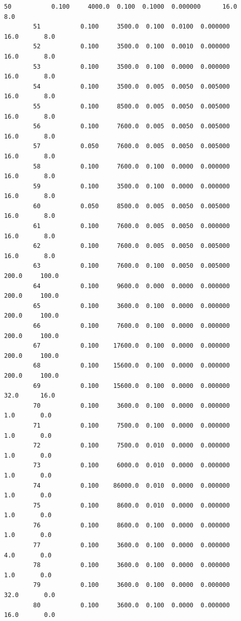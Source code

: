 \documentclass[11pt, a4paper , landscape]{article}
\begin{document}
\begin{Verbatim}[commandchars=\\\{\}]
        50           0.100     4000.0  0.100  0.1000  0.000000      16.0       8.0   
        51           0.100     3500.0  0.100  0.0100  0.000000      16.0       8.0   
        52           0.100     3500.0  0.100  0.0010  0.000000      16.0       8.0   
        53           0.100     3500.0  0.100  0.0000  0.000000      16.0       8.0   
        54           0.100     3500.0  0.005  0.0050  0.005000      16.0       8.0   
        55           0.100     8500.0  0.005  0.0050  0.005000      16.0       8.0   
        56           0.100     7600.0  0.005  0.0050  0.005000      16.0       8.0   
        57           0.050     7600.0  0.005  0.0050  0.005000      16.0       8.0   
        58           0.100     7600.0  0.100  0.0000  0.000000      16.0       8.0   
        59           0.100     3500.0  0.100  0.0000  0.000000      16.0       8.0   
        60           0.050     8500.0  0.005  0.0050  0.005000      16.0       8.0   
        61           0.100     7600.0  0.005  0.0050  0.000000      16.0       8.0   
        62           0.100     7600.0  0.005  0.0050  0.005000      16.0       8.0   
        63           0.100     7600.0  0.100  0.0050  0.005000     200.0     100.0   
        64           0.100     9600.0  0.000  0.0000  0.000000     200.0     100.0   
        65           0.100     3600.0  0.100  0.0000  0.000000     200.0     100.0   
        66           0.100     7600.0  0.100  0.0000  0.000000     200.0     100.0   
        67           0.100    17600.0  0.100  0.0000  0.000000     200.0     100.0   
        68           0.100    15600.0  0.100  0.0000  0.000000     200.0     100.0   
        69           0.100    15600.0  0.100  0.0000  0.000000      32.0      16.0   
        70           0.100     3600.0  0.100  0.0000  0.000000       1.0       0.0   
        71           0.100     7500.0  0.100  0.0000  0.000000       1.0       0.0   
        72           0.100     7500.0  0.010  0.0000  0.000000       1.0       0.0   
        73           0.100     6000.0  0.010  0.0000  0.000000       1.0       0.0   
        74           0.100    86000.0  0.010  0.0000  0.000000       1.0       0.0   
        75           0.100     8600.0  0.010  0.0000  0.000000       1.0       0.0   
        76           0.100     8600.0  0.100  0.0000  0.000000       1.0       0.0   
        77           0.100     3600.0  0.100  0.0000  0.000000       4.0       0.0   
        78           0.100     3600.0  0.100  0.0000  0.000000       1.0       0.0   
        79           0.100     3600.0  0.100  0.0000  0.000000      32.0       0.0   
        80           0.100     3600.0  0.100  0.0000  0.000000      16.0       0.0   

\end{Verbatim}
\end{document}
